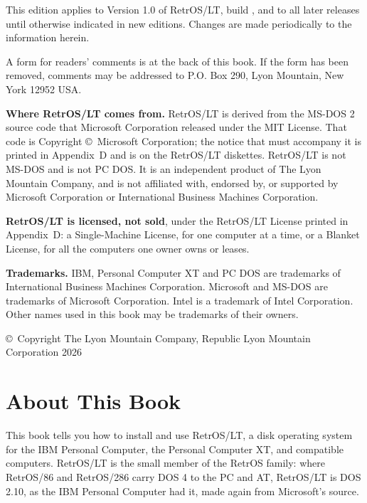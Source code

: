 \pagestyle{blank}
\vspace*{\fill}
\begin{wide}
\small
\textbf{\edition}

This edition applies to Version 1.0 of RetrOS/LT, build \release, and to
all later releases until otherwise indicated in new editions. Changes are
made periodically to the information herein. \editionchanges

A form for readers' comments is at the back of this book. If the form has
been removed, comments may be addressed to P.O. Box 290, Lyon Mountain,
New York 12952 USA.

\textbf{Where RetrOS/LT comes from.} RetrOS/LT is derived from the MS-DOS 2
source code that Microsoft Corporation released under the MIT License.
That code is Copyright \copyright\ Microsoft Corporation; the notice that
must accompany it is printed in Appendix~D and is on the RetrOS/LT
diskettes. RetrOS/LT is not MS-DOS and is not PC DOS. It is an independent
product of The Lyon Mountain Company, and is not affiliated with, endorsed
by, or supported by Microsoft Corporation or International Business
Machines Corporation.

\textbf{RetrOS/LT is licensed, not sold}, under the RetrOS/LT License
printed in Appendix~D: a Single-Machine License, for one computer at a
time, or a Blanket License, for all the computers one owner owns or
leases.

\textbf{Trademarks.} IBM, Personal Computer XT and PC DOS are trademarks
of International Business Machines Corporation. Microsoft and MS-DOS are
trademarks of Microsoft Corporation. Intel is a trademark of Intel
Corporation. Other names used in this book may be trademarks of their
owners.

\copyright\ Copyright The Lyon Mountain Company, Republic Lyon Mountain Corporation 2026
\end{wide}
\newpage

\pagestyle{plain}
\renewcommand\runningtitle{About This Book}
\chapter*{About This Book}


This book tells you how to install and use RetrOS/LT, a disk operating
system for the IBM Personal Computer, the Personal Computer XT, and
compatible computers. RetrOS/LT is the small member of the RetrOS family:
where RetrOS/86 and RetrOS/286 carry DOS 4 to the PC and AT, RetrOS/LT is
DOS 2.10, as the IBM Personal Computer had it, made again from Microsoft's
source.

